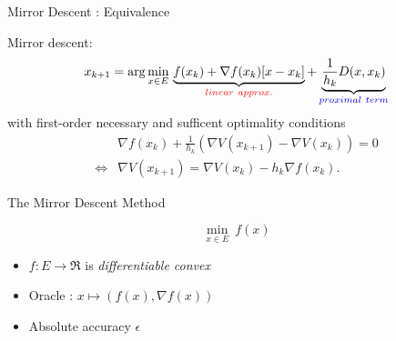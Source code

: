 \documentclass[9pt]{beamer}
\begin{document}
\begin{frame}{Mirror Descent : Equivalence}

  Mirror descent:
  \[
    x_{k+1} = \arg\min_{x\in E} \, \underbrace{f(x_k) + \nabla f(x_k)[x-x_k]}_{{\color{red} linear~approx.}} + \underbrace{\frac{1}{h_k} D(x, x_k)}_{{\color{blue} proximal~term}}
  \]
  with first-order necessary and sufficent optimality conditions
  \begin{align*}
    & \nabla f(x_{k}) + \frac{1}{h_k} (\nabla V(x_{k+1}) - \nabla V(x_k)) = 0 \\
    \iff & \nabla V(x_{k+1}) = \nabla V(x_k) - h_k \nabla f(x_k).
  \end{align*}

  \vfill

\end{frame}

\begin{frame}{The Mirror Descent Method}

  \begin{minipage}{0.5\textwidth}
    \begin{equation*}
      \min_{x\in E} ~f(x)
    \end{equation*}
  \end{minipage}%
  \hfill
  \begin{minipage}{0.5\textwidth}
    \begin{itemize}
    \item $f:E\to\Re$ is \emph{differentiable convex}
    \item Oracle : $x\mapsto (f(x), \nabla f(x))$
    \item Absolute accuracy $\epsilon$
    \end{itemize}
  \end{minipage}

  \vfill

  \begin{algorithm}[H]
    \caption{\emph{Mirror Descent Method}}
  \end{algorithm}

\end{frame}
\end{document}

